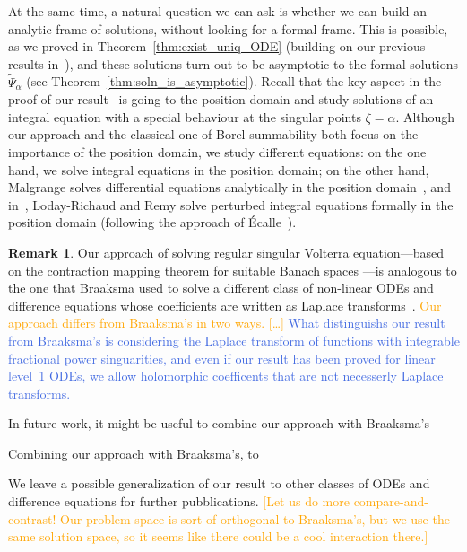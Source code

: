\documentclass{article}
\theoremstyle{definition}
\newtheorem{remark}[definition]{Remark}
\theoremstyle{plain}
\begin{document}
At the same time, a natural question we can ask is whether we can build an analytic frame of solutions, without looking for a formal frame. This is possible, as we proved in Theorem~\ref{thm:exist_uniq_ODE} (building on our previous results in~\cite{reg-sing-volterra}), and these solutions turn out to be asymptotic to the formal solutions $\tilde{\Psi}_\alpha$ (see Theorem~\ref{thm:soln_is_asymptotic}). Recall that the key aspect in the proof of our result~\cite[Theorem~4]{reg-sing-volterra} is going to the position domain and study solutions of an integral equation with a special behaviour at the singular points $\zeta=\alpha$. Although our approach and the classical one of Borel summability both focus on the importance of the position domain, we study different equations: on the one hand, we solve integral equations in the position domain; on the other hand, Malgrange solves differential equations analytically in the position domain~\cite{malgrange--fourier}, and in~\cite{loday-Remy2011}, Loday-Richaud and Remy solve perturbed integral equations formally in the position domain (following the approach of \'Ecalle~\cite{EcalleIII}). 

\begin{remark}
Our approach of solving regular singular Volterra equation---based on the contraction mapping theorem for suitable Banach spaces \cite{reg-sing-volterra}---is analogous to the one that Braaksma used to solve a different class of non-linear ODEs and difference equations whose coefficients are written as Laplace transforms~\cite{braaksma2006laplace}. \textcolor{orange}{Our approach differs from Braaksma's in two ways. [\ldots]} \textcolor{RoyalBlue}{What distinguishs our result from Braaksma's is considering the Laplace transform of functions with integrable fractional power singuarities, and even if our result has been proved for linear level~1 ODEs, we allow holomorphic coefficents that are not necesserly Laplace transforms.}

In future work, it might be useful to combine our approach with Braaksma's

Combining our approach with Braaksma's, to

We leave a possible generalization of our result to other classes of ODEs and difference equations for further pubblications. \textcolor{orange}{[Let us do more compare-and-contrast! Our problem space is sort of orthogonal to Braaksma's, but we use the same solution space, so it seems like there could be a cool interaction there.]}
\end{remark}
\end{document}
